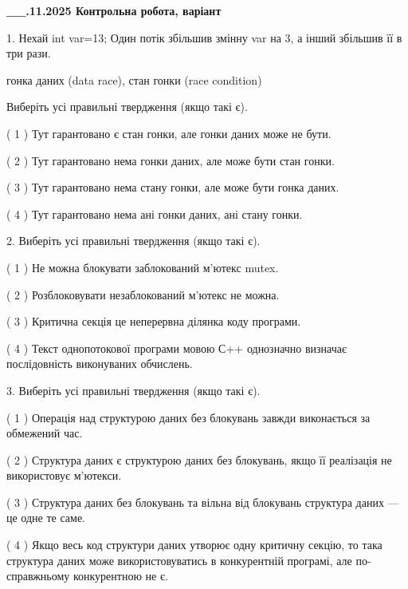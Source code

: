 \documentclass[12pt, ukrainian]{article}
\begin{document}
\newpage
\begin {large}

\textbf{\_\_.11.2025 Контрольна робота, варіант  }\par


{
1. Нехай int var=13; Один потік збільшив змінну var на 3, а інший збільшив її в три рази.

гонка даних (data race), стан гонки (race condition)

Виберіть усі правильні твердження (якщо такі є).\par
\vspace{2mm}
( 1 ) Тут гарантовано є стан гонки, але гонки даних може не бути.%

( 2 ) Тут гарантовано нема гонки даних, але може бути стан гонки.%

( 3 ) Тут гарантовано нема стану гонки, але може бути гонка даних.%

( 4 ) Тут гарантовано нема ані гонки даних, ані стану гонки.%


2. Виберіть усі правильні твердження (якщо такі є).\par
\vspace{2mm}

( 1 ) Не можна блокувати заблокований м’ютекс mutex.%

( 2 ) Розблоковувати незаблокований м’ютекс не можна.%

( 3 ) Критична секція це неперервна ділянка коду програми.%

( 4 ) Текст однопотокової програми мовою С++ однозначно визначає послідовність виконуваних обчислень.%


3. Виберіть усі правильні твердження (якщо такі є).\par
\vspace{2mm}

( 1 ) Операція над структурою даних без блокувань завжди виконається за обмежений час.%

( 2 ) Структура даних є структурою даних без блокувань, якщо її реалізація не використовує м’ютекси.%

( 3 ) Структура даних без блокувань та вільна від блокувань структура даних --- це одне те саме.%

( 4 ) Якщо весь код структури даних утворює одну критичну секцію, то така структура даних може використовуватись в конкурентній програмі, але по-справжньо\-му конкурентною не є.%


}
\end{large}
\end{document}
